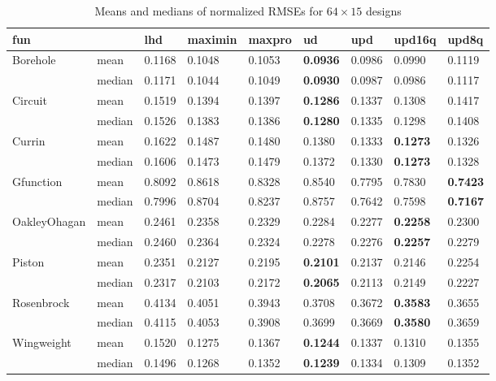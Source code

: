 \documentclass [PhD] {package/uclathes}
\begin{document}
\begin{table}[h!tb]

\caption{\label{tab:mean_median_64x15}Means and medians of normalized RMSEs for $64\times 15$ designs}
\centering
\begin{tabular}[t]{lllllllll}
\toprule
fun &  & lhd & maximin & maxpro & ud & upd & upd16q & upd8q\\
\midrule
Borehole & mean & 0.1168 & 0.1048 & 0.1053 & \textbf{0.0936} & 0.0986 & 0.0990 & 0.1119\\
\cmidrule{2-9}
 & median & 0.1171 & 0.1044 & 0.1049 & \textbf{0.0930} & 0.0987 & 0.0986 & 0.1117\\
\cmidrule{1-9}
Circuit & mean & 0.1519 & 0.1394 & 0.1397 & \textbf{0.1286} & 0.1337 & 0.1308 & 0.1417\\
\cmidrule{2-9}
 & median & 0.1526 & 0.1383 & 0.1386 & \textbf{0.1280} & 0.1335 & 0.1298 & 0.1408\\
\cmidrule{1-9}
Currin & mean & 0.1622 & 0.1487 & 0.1480 & 0.1380 & 0.1333 & \textbf{0.1273} & 0.1326\\
\cmidrule{2-9}
 & median & 0.1606 & 0.1473 & 0.1479 & 0.1372 & 0.1330 & \textbf{0.1273} & 0.1328\\
\cmidrule{1-9}
Gfunction & mean & 0.8092 & 0.8618 & 0.8328 & 0.8540 & 0.7795 & 0.7830 & \textbf{0.7423}\\
\cmidrule{2-9}
 & median & 0.7996 & 0.8704 & 0.8237 & 0.8757 & 0.7642 & 0.7598 & \textbf{0.7167}\\
\cmidrule{1-9}
OakleyOhagan & mean & 0.2461 & 0.2358 & 0.2329 & 0.2284 & 0.2277 & \textbf{0.2258} & 0.2300\\
\cmidrule{2-9}
 & median & 0.2460 & 0.2364 & 0.2324 & 0.2278 & 0.2276 & \textbf{0.2257} & 0.2279\\
\cmidrule{1-9}
Piston & mean & 0.2351 & 0.2127 & 0.2195 & \textbf{0.2101} & 0.2137 & 0.2146 & 0.2254\\
\cmidrule{2-9}
 & median & 0.2317 & 0.2103 & 0.2172 & \textbf{0.2065} & 0.2113 & 0.2149 & 0.2227\\
\cmidrule{1-9}
Rosenbrock & mean & 0.4134 & 0.4051 & 0.3943 & 0.3708 & 0.3672 & \textbf{0.3583} & 0.3655\\
\cmidrule{2-9}
 & median & 0.4115 & 0.4053 & 0.3908 & 0.3699 & 0.3669 & \textbf{0.3580} & 0.3659\\
\cmidrule{1-9}
Wingweight & mean & 0.1520 & 0.1275 & 0.1367 & \textbf{0.1244} & 0.1337 & 0.1310 & 0.1355\\
\cmidrule{2-9}
 & median & 0.1496 & 0.1268 & 0.1352 & \textbf{0.1239} & 0.1334 & 0.1309 & 0.1352\\
\bottomrule
\end{tabular}
\end{table}
\end{document}
